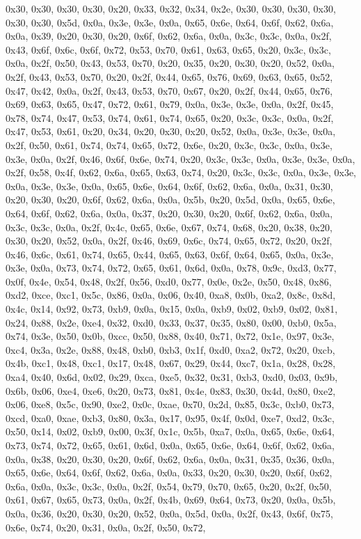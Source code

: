 \documentclass[
]{book}
\theoremstyle{definition}
\theoremstyle{definition}
\theoremstyle{definition}
\theoremstyle{remark}
\begin{document}
0x30, 0x30, 0x30, 0x30, 0x20, 0x33, 0x32, 0x34, 0x2e, 0x30, 0x30, 0x30, 0x30, 0x30, 0x30, 0x5d, 0x0a, 0x3e, 0x3e, 0x0a, 0x65, 0x6e, 0x64, 0x6f, 0x62, 0x6a, 0x0a, 0x39, 0x20, 0x30, 0x20, 0x6f, 0x62, 0x6a, 0x0a, 0x3c, 0x3c, 0x0a, 0x2f, 0x43, 0x6f, 0x6c, 0x6f, 0x72, 0x53, 0x70, 0x61, 0x63, 0x65, 0x20, 0x3c, 0x3c, 0x0a, 0x2f, 0x50, 0x43, 0x53, 0x70, 0x20, 0x35, 0x20, 0x30, 0x20, 0x52, 0x0a, 0x2f, 0x43, 0x53, 0x70, 0x20, 0x2f, 0x44, 0x65, 0x76, 0x69, 0x63, 0x65, 0x52, 0x47, 0x42, 0x0a, 0x2f, 0x43, 0x53,
0x70, 0x67, 0x20, 0x2f, 0x44, 0x65, 0x76, 0x69, 0x63, 0x65, 0x47, 0x72, 0x61, 0x79, 0x0a, 0x3e, 0x3e, 0x0a, 0x2f, 0x45, 0x78, 0x74, 0x47, 0x53, 0x74, 0x61, 0x74, 0x65, 0x20, 0x3c, 0x3c, 0x0a, 0x2f, 0x47, 0x53, 0x61, 0x20, 0x34, 0x20, 0x30, 0x20, 0x52, 0x0a, 0x3e, 0x3e, 0x0a, 0x2f, 0x50, 0x61, 0x74, 0x74, 0x65, 0x72, 0x6e, 0x20, 0x3c, 0x3c, 0x0a, 0x3e, 0x3e, 0x0a, 0x2f, 0x46, 0x6f, 0x6e, 0x74, 0x20, 0x3c, 0x3c, 0x0a, 0x3e, 0x3e, 0x0a, 0x2f, 0x58, 0x4f, 0x62, 0x6a, 0x65, 0x63, 0x74, 0x20, 0x3c, 0x3c,
0x0a, 0x3e, 0x3e, 0x0a, 0x3e, 0x3e, 0x0a, 0x65, 0x6e, 0x64, 0x6f, 0x62, 0x6a, 0x0a, 0x31, 0x30, 0x20, 0x30, 0x20, 0x6f, 0x62, 0x6a, 0x0a, 0x5b, 0x20, 0x5d, 0x0a, 0x65, 0x6e, 0x64, 0x6f, 0x62, 0x6a, 0x0a, 0x37, 0x20, 0x30, 0x20, 0x6f, 0x62, 0x6a, 0x0a, 0x3c, 0x3c, 0x0a, 0x2f, 0x4c, 0x65, 0x6e, 0x67, 0x74, 0x68, 0x20, 0x38, 0x20, 0x30, 0x20, 0x52, 0x0a, 0x2f, 0x46, 0x69, 0x6c, 0x74, 0x65, 0x72, 0x20, 0x2f, 0x46, 0x6c, 0x61, 0x74, 0x65, 0x44, 0x65, 0x63, 0x6f, 0x64, 0x65, 0x0a, 0x3e, 0x3e, 0x0a, 0x73,
0x74, 0x72, 0x65, 0x61, 0x6d, 0x0a, 0x78, 0x9c, 0xd3, 0x77, 0x0f, 0x4e, 0x54, 0x48, 0x2f, 0x56, 0xd0, 0x77, 0x0e, 0x2e, 0x50, 0x48, 0x86, 0xd2, 0xce, 0xc1, 0x5c, 0x86, 0x0a, 0x06, 0x40, 0xa8, 0x0b, 0xa2, 0x8c, 0x8d, 0x4c, 0x14, 0x92, 0x73, 0xb9, 0x0a, 0x15, 0x0a, 0xb9, 0x02, 0xb9, 0x02, 0x81, 0x24, 0x88, 0x2e, 0xe4, 0x32, 0xd0, 0x33, 0x37, 0x35, 0x80, 0x00, 0xb0, 0x5a, 0x74, 0x3e, 0x50, 0x0b, 0xcc, 0x50, 0x88, 0x40, 0x71, 0x72, 0x1e, 0x97, 0x3e, 0xc4, 0x3a, 0x2e, 0x88, 0x48, 0xb0, 0xb3, 0x1f, 0xd0,
0xa2, 0x72, 0x20, 0xcb, 0x4b, 0xc1, 0x48, 0xc1, 0x17, 0x48, 0x67, 0x29, 0x44, 0xc7, 0x1a, 0x28, 0x28, 0xa4, 0x40, 0x6d, 0x02, 0x29, 0xca, 0xe5, 0x32, 0x31, 0xb3, 0xd0, 0x03, 0x9b, 0x6b, 0x06, 0xe4, 0xe6, 0x20, 0x73, 0x81, 0x4e, 0x83, 0x30, 0x4d, 0x80, 0xe2, 0x06, 0xe8, 0x5c, 0x90, 0xe2, 0x0c, 0xae, 0x70, 0x2d, 0x85, 0x3c, 0xb0, 0x73, 0xcd, 0xa0, 0xae, 0xb3, 0x80, 0x3a, 0x17, 0x95, 0x4f, 0x0d, 0xe7, 0xd2, 0x3c, 0x50, 0x14, 0x02, 0xb9, 0x00, 0x3f, 0x1c, 0x5b, 0xa7, 0x0a, 0x65, 0x6e, 0x64, 0x73, 0x74,
0x72, 0x65, 0x61, 0x6d, 0x0a, 0x65, 0x6e, 0x64, 0x6f, 0x62, 0x6a, 0x0a, 0x38, 0x20, 0x30, 0x20, 0x6f, 0x62, 0x6a, 0x0a, 0x31, 0x35, 0x36, 0x0a, 0x65, 0x6e, 0x64, 0x6f, 0x62, 0x6a, 0x0a, 0x33, 0x20, 0x30, 0x20, 0x6f, 0x62, 0x6a, 0x0a, 0x3c, 0x3c, 0x0a, 0x2f, 0x54, 0x79, 0x70, 0x65, 0x20, 0x2f, 0x50, 0x61, 0x67, 0x65, 0x73, 0x0a, 0x2f, 0x4b, 0x69, 0x64, 0x73, 0x20, 0x0a, 0x5b, 0x0a, 0x36, 0x20, 0x30, 0x20, 0x52, 0x0a, 0x5d, 0x0a, 0x2f, 0x43, 0x6f, 0x75, 0x6e, 0x74, 0x20, 0x31, 0x0a, 0x2f, 0x50, 0x72,
\end{document}

